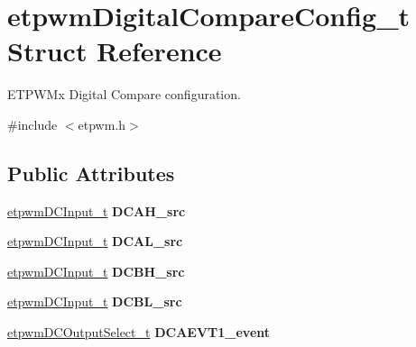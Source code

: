 \hypertarget{structetpwmDigitalCompareConfig__t}{}\section{etpwm\+Digital\+Compare\+Config\+\_\+t Struct Reference}
\label{structetpwmDigitalCompareConfig__t}


E\+T\+P\+W\+Mx Digital Compare configuration.  




{\ttfamily \#include $<$etpwm.\+h$>$}

\subsection*{Public Attributes}
\begin{DoxyCompactItemize}
\item 
\mbox{\label{structetpwmDigitalCompareConfig__t_a21f7d4b4c41c6dddd356ff73b8787832}} 
\mbox{\hyperlink{etpwm_8h_a4a78ac05edac590250696055faca227f}{etpwm\+D\+C\+Input\+\_\+t}} {\bfseries D\+C\+A\+H\+\_\+src}
\item 
\mbox{\label{structetpwmDigitalCompareConfig__t_a18ba09dccf6a9388ce605236416ee3d4}} 
\mbox{\hyperlink{etpwm_8h_a4a78ac05edac590250696055faca227f}{etpwm\+D\+C\+Input\+\_\+t}} {\bfseries D\+C\+A\+L\+\_\+src}
\item 
\mbox{\label{structetpwmDigitalCompareConfig__t_a3c2f806e4fb242c60184c717b085edc5}} 
\mbox{\hyperlink{etpwm_8h_a4a78ac05edac590250696055faca227f}{etpwm\+D\+C\+Input\+\_\+t}} {\bfseries D\+C\+B\+H\+\_\+src}
\item 
\mbox{\label{structetpwmDigitalCompareConfig__t_a2f01b2a59d479d09a3a5dc7e0b4c9f3a}} 
\mbox{\hyperlink{etpwm_8h_a4a78ac05edac590250696055faca227f}{etpwm\+D\+C\+Input\+\_\+t}} {\bfseries D\+C\+B\+L\+\_\+src}
\item 
\mbox{\label{structetpwmDigitalCompareConfig__t_ac4b15a999c335bda9d75ae221d22fbc0}} 
\mbox{\hyperlink{etpwm_8h_a320d139cfe64e8a4bd00653a21aa6a7f}{etpwm\+D\+C\+Output\+Select\+\_\+t}} {\bfseries D\+C\+A\+E\+V\+T1\+\_\+event}

\end{DoxyCompactItemize}
